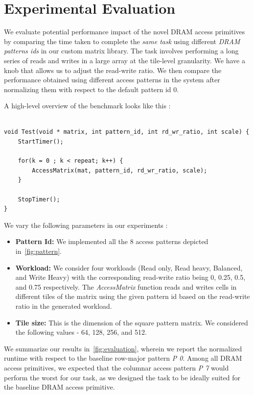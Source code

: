 \documentclass[letterpaper]{article}
\begin{document}
\section{Experimental Evaluation}

We evaluate potential performance impact of the novel DRAM access primitives by
comparing the time taken to complete the \textit{same task} using different
\textit{DRAM patterns ids} in our custom matrix library. 
The task involves performing a long series of reads and writes in a large array
at the tile-level granularity. We have a knob that allows us to adjust the
read-write ratio.
We then compare the performance obtained using different access patterns 
in the system after normalizing them with respect to the default pattern id $0$.

A high-level overview of the benchmark looks like this :

\begin{lstlisting}[caption={Benchmark}]

void Test(void * matrix, int pattern_id, int rd_wr_ratio, int scale) {
    StartTimer();
    
    for(k = 0 ; k < repeat; k++) {
        AccessMatrix(mat, pattern_id, rd_wr_ratio, scale);
    }

    StopTimer();
}

\end{lstlisting}

We vary the following parameters in our experiments :

\begin{itemize}
  \item \textbf{Pattern Id:} We implemented all the 8 access patterns depicted
  in~\cref{fig:pattern}.
  \item \textbf{Workload:} We consider four workloads (Read only, Read heavy,
Balanced, and Write Heavy) with the corresponding read-write ratio being 0,
0.25, 0.5, and 0.75 respectively. The \textit{AccessMatrix} function reads and writes
cells in different tiles of the matrix using the given pattern id based on the
read-write ratio in the generated workload.
  \item \textbf{Tile size:} This is the dimension of the square pattern matrix. 
  We considered the following values - 64, 128, 256, and 512.
\end{itemize}

We summarize our results in~\cref{fig:evaluation}, wherein we report the
normalized runtime with respect to the baseline row-major pattern \textit{P 0}.
Among all DRAM access primitives, we expected that the columnar access pattern
\textit{P 7} would perform the worst for our task, as we designed the task to
be ideally suited for the baseline DRAM access primitive.
\end{document}
